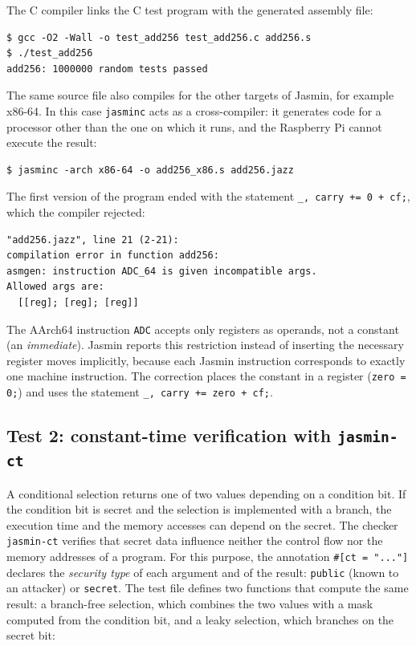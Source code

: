 \documentclass[11pt,a4paper]{article}
\newcommand{\file}[1]{\texttt{#1}}
\begin{document}


The C compiler links the C test program with the generated assembly file:

\begin{lstlisting}[style=shell]
$ gcc -O2 -Wall -o test_add256 test_add256.c add256.s
$ ./test_add256
add256: 1000000 random tests passed
\end{lstlisting}

The same source file also compiles for the other targets of Jasmin, for
example x86-64. In this case \texttt{jasminc} acts as a cross-compiler: it
generates code for a processor other than the one on which it runs, and the
Raspberry Pi cannot execute the result:

\begin{lstlisting}[style=shell]
$ jasminc -arch x86-64 -o add256_x86.s add256.jazz
\end{lstlisting}

\begin{warning}
The first version of the program ended with the statement
\lstinline[style=jasmin,numbers=none,frame=none]|_, carry += 0 + cf;|,
which the compiler rejected:
\begin{lstlisting}[style=output]
"add256.jazz", line 21 (2-21):
compilation error in function add256:
asmgen: instruction ADC_64 is given incompatible args.
Allowed args are:
  [[reg]; [reg]; [reg]]
\end{lstlisting}
The AArch64 instruction \texttt{ADC} accepts only registers as operands, not
a constant (an \emph{immediate}). Jasmin reports this restriction instead of
inserting the necessary register moves implicitly, because each Jasmin
instruction corresponds to exactly one machine instruction. The correction
places the constant in a register
(\lstinline[style=jasmin,numbers=none,frame=none]|zero = 0;|) and uses the
statement \lstinline[style=jasmin,numbers=none,frame=none]|_, carry += zero + cf;|.
\end{warning}

\subsection{Test 2: constant-time verification with \texttt{jasmin-ct}}

A conditional selection returns one of two values depending on a condition
bit. If the condition bit is secret and the selection is implemented with a
branch, the execution time and the memory accesses can depend on the
secret. The checker \texttt{jasmin-ct} verifies that secret data influence
neither the control flow nor the memory addresses of a program. For this
purpose, the annotation \texttt{\#[ct = "..."]} declares the \emph{security
type} of each argument and of the result: \texttt{public} (known to an
attacker) or \texttt{secret}. The test file defines two functions that
compute the same result: a branch-free selection, which combines the two values with a
mask computed from the condition bit, and a leaky selection, which branches
on the secret bit:
\end{document}
